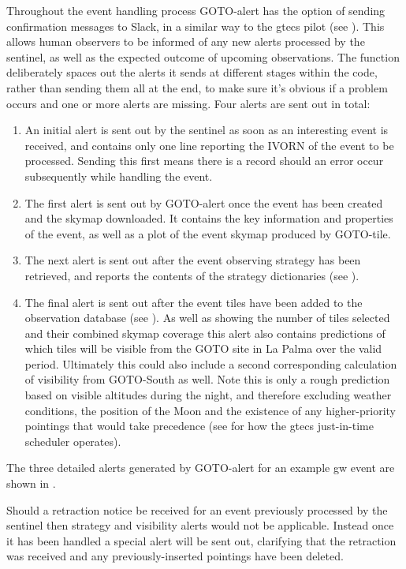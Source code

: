 \begin{colsection}
\begin{colsection}
Throughout the event handling process GOTO-alert has the option of sending confirmation messages to Slack, in a similar way to the \gls{gtecs} pilot (see ). This allows human observers to be informed of any new alerts processed by the sentinel, as well as the expected outcome of upcoming observations. The function deliberately spaces out the alerts it sends at different stages within the code, rather than sending them all at the end, to make sure it's obvious if a problem occurs and one or more alerts are missing. Four alerts are sent out in total:

\begin{enumerate}
    \item An initial alert is sent out by the sentinel as soon as an interesting event is received, and contains only one line reporting the IVORN of the event to be processed. Sending this first means there is a record should an error occur subsequently while handling the event.
    \item The first alert is sent out by GOTO-alert once the event has been created and the skymap downloaded. It contains the key information and properties of the event, as well as a plot of the event skymap produced by GOTO-tile.
    \item The next alert is sent out after the event observing strategy has been retrieved, and reports the contents of the strategy dictionaries (see ).
    \item The final alert is sent out after the event tiles have been added to the observation database (see ). As well as showing the number of tiles selected and their combined skymap coverage this alert also contains predictions of which tiles will be visible from the GOTO site in La Palma over the valid period. Ultimately this could also include a second corresponding calculation of visibility from GOTO-South as well. Note this is only a rough prediction based on visible altitudes during the night, and therefore excluding weather conditions, the position of the Moon and the existence of any higher-priority pointings that would take precedence (see  for how the \gls{gtecs} just-in-time scheduler operates).
\end{enumerate}

The three detailed alerts generated by GOTO-alert for an example \gls{gw} event are shown in .

Should a retraction notice be received for an event previously processed by the sentinel then strategy and visibility alerts would not be applicable. Instead once it has been handled a special alert will be sent out, clarifying that the retraction was received and any previously-inserted pointings have been deleted.


\end{colsection}
\end{colsection}
